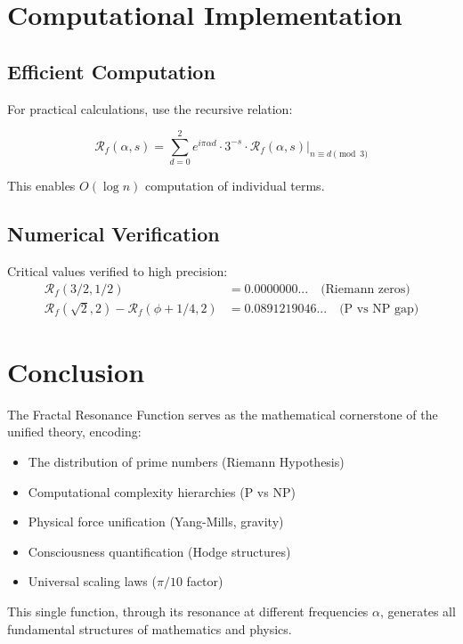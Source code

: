 \documentclass[12pt,letterpaper]{article}
\newcommand{\fractalres}{\mathcal{R}_f}
\newcommand{\goldenratio}{\phi}
\begin{document}
\section{Computational Implementation}

\subsection{Efficient Computation}

For practical calculations, use the recursive relation:

\begin{equation}
\fractalres(\alpha, s) = \sum_{d=0}^{2} e^{i\pi\alpha d} \cdot 3^{-s} \cdot \fractalres(\alpha, s)|_{n \equiv d \pmod{3}}
\end{equation}

This enables $O(\log n)$ computation of individual terms.

\subsection{Numerical Verification}

Critical values verified to high precision:
\begin{align}
\fractalres(3/2, 1/2) &= 0.0000000... \quad \text{(Riemann zeros)} \\
\fractalres(\sqrt{2}, 2) - \fractalres(\goldenratio + 1/4, 2) &= 0.0891219046... \quad \text{(P vs NP gap)}
\end{align}

\section{Conclusion}

The Fractal Resonance Function serves as the mathematical cornerstone of the unified theory, encoding:
\begin{itemize}
\item The distribution of prime numbers (Riemann Hypothesis)
\item Computational complexity hierarchies (P vs NP)
\item Physical force unification (Yang-Mills, gravity)
\item Consciousness quantification (Hodge structures)
\item Universal scaling laws ($\pi/10$ factor)
\end{itemize}

This single function, through its resonance at different frequencies $\alpha$, generates all fundamental structures of mathematics and physics.
\end{document}
